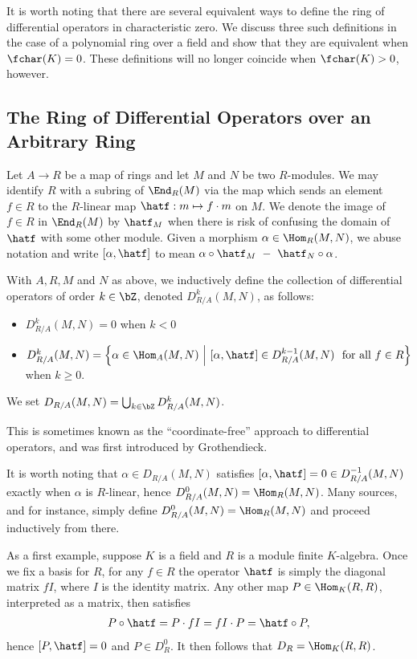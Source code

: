 It is worth noting that there are several equivalent ways to define the ring of differential operators in characteristic zero. We discuss three such definitions in the case of a polynomial ring over a field and show that they are equivalent when $\fchar(K) = 0$. These definitions will no longer coincide when $\fchar(K) > 0$, however.

\subsection{The Ring of Differential Operators over an Arbitrary Ring}\label{sec:general-diff-ops}
Let $A\to R$ be a map of rings and let $M$ and $N$ be two $R$-modules. We may identify $R$ with a subring of $\End_R(M)$ via the map which sends an element $f \in R$ to the $R$-linear map $\hatf:m\mapsto f\cdot m$ on $M$. We denote the image of $f \in R$ in $\End_R(M)$ by $\hatf_M$ when there is risk of confusing the domain of $\hatf$ with some other module. Given a morphism $\alpha \in \Hom_R(M,N)$, we abuse notation and write $[\alpha, \hatf]$ to mean $\alpha \circ \hatf_M ~-~ \hatf_N\circ \alpha$.

\begin{defn}\label{defn:diff-ops}
	With $A,R,M$ and $N$ as above, we inductively define the collection of differential operators of order $k \in \bZ$, denoted $D^k_{R/A}(M,N)$, as follows:
	\begin{itemize}
		\item $D^k_{R/A}(M,N) = 0$ when $k < 0$
		\item $D^k_{R/A}(M,N) = \left\{\alpha \in \Hom_A(M,N) ~\middle|~ \left[\alpha,\hatf\right] \in D^{k-1}_{R/A}(M,N) ~ \text{ for all } f\in R\right\} $ when $k \geq 0$.
	\end{itemize}
	We set $D_{R/A}(M,N) = \bigcup_{k\in \bZ} D^k_{R/A}(M,N)$.
\end{defn}
This is sometimes known as the ``coordinate-free'' approach to differential operators, and was first introduced by Grothendieck.
\begin{rmk}\label{rmk:starting-index-of-diff-op-def}
	It is worth noting that $\alpha \in D_{R/A}(M,N)$ satisfies $[\alpha,\hatf] = 0 \in D^{-1}_{R/A}(M,N)$ exactly when $\alpha$ is $R$-linear, hence $D^0_{R/A}(M,N) = \Hom_R(M,N)$. Many sources, \cite{ginzburg_d-mod} and \cite{bernstein_d-mod} for instance, simply define $D^0_{R/A}(M,N) = \Hom_{R}(M,N)$ and proceed inductively from there.
\end{rmk}

\begin{example}\label{example:module-finite-K-alg-diff-ops}
	As a first example, suppose $K$ is a field and $R$ is a module finite $K$-algebra. Once we fix a basis for $R$, for any $f \in R$ the operator $\hatf$ is simply the diagonal matrix $fI$, where $I$ is the identity matrix. Any other map $P \in \Hom_K(R,R)$, interpreted as a matrix, then satisfies
	\begin{align*}
		P\circ \hatf = P\cdot fI = fI\cdot P = \hatf\circ P,
	\end{align*}
	hence $[P,\hatf] = 0$ and $P \in D^0_{R}$. It then follows that $D_{R} = \Hom_K(R,R)$.
\end{example}

